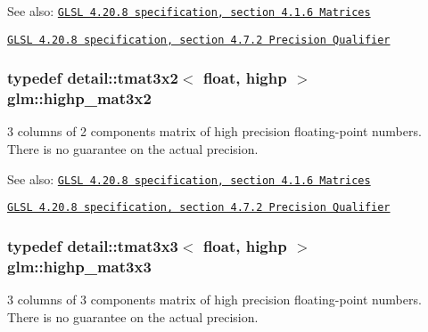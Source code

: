 \begin{Desc}
\item[See also:]\href{http://www.opengl.org/registry/doc/GLSLangSpec.4.20.8.pdf}{\tt GLSL 4.20.8 specification, section 4.1.6 Matrices} 

\href{http://www.opengl.org/registry/doc/GLSLangSpec.4.20.8.pdf}{\tt GLSL 4.20.8 specification, section 4.7.2 Precision Qualifier} \end{Desc}
\hypertarget{group__core__precision_gbc7767293ff69cd56717ee9d8be62963}{
\subsubsection[highp\_\-mat3x2]{\setlength{\rightskip}{0pt plus 5cm}typedef detail::tmat3x2$<$ float, highp $>$ {\bf glm::highp\_\-mat3x2}}}
\label{group__core__precision_gbc7767293ff69cd56717ee9d8be62963}


3 columns of 2 components matrix of high precision floating-point numbers. There is no guarantee on the actual precision.

\begin{Desc}
\item[See also:]\href{http://www.opengl.org/registry/doc/GLSLangSpec.4.20.8.pdf}{\tt GLSL 4.20.8 specification, section 4.1.6 Matrices} 

\href{http://www.opengl.org/registry/doc/GLSLangSpec.4.20.8.pdf}{\tt GLSL 4.20.8 specification, section 4.7.2 Precision Qualifier} \end{Desc}
\hypertarget{group__core__precision_g8a3703cc71cdfc8928eddf46b3763c4b}{
\subsubsection[highp\_\-mat3x3]{\setlength{\rightskip}{0pt plus 5cm}typedef detail::tmat3x3$<$ float, highp $>$ {\bf glm::highp\_\-mat3x3}}}
\label{group__core__precision_g8a3703cc71cdfc8928eddf46b3763c4b}


3 columns of 3 components matrix of high precision floating-point numbers. There is no guarantee on the actual precision.

